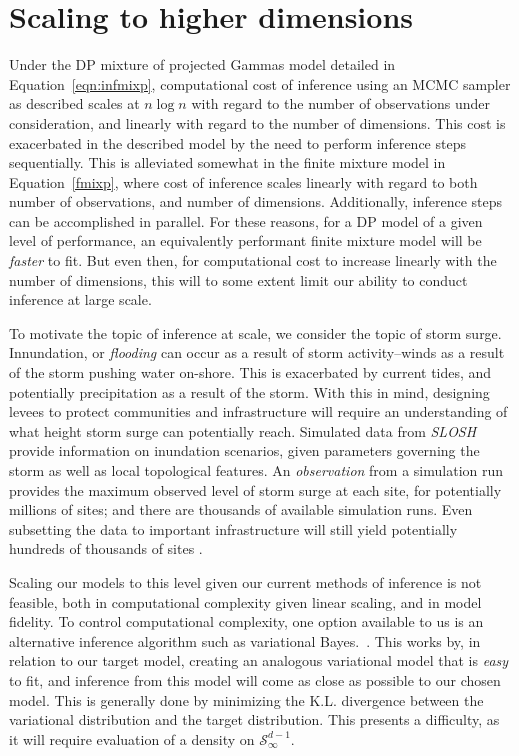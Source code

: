 \section{Scaling to higher dimensions}
Under the DP mixture of projected Gammas model detailed in Equation~\ref{eqn:infmixp}, computational
  cost of inference using an MCMC sampler as described scales at $n\log n$ with regard to the number
  of observations under consideration, and linearly with regard to the number of dimensions.  This cost
  is exacerbated in the described model by the need to perform inference steps sequentially.  This is
  alleviated somewhat in the finite mixture model in Equation~\ref{fmixp}, where cost of inference scales
  linearly with regard to both number of observations, and number of dimensions.  Additionally, inference
  steps can be accomplished in parallel.  For these reasons, for a DP model of a given level of performance,
  an equivalently performant finite mixture model will be \emph{faster} to fit.  But even then, for
  computational cost to increase linearly with the number of dimensions, this will to some extent limit
  our ability to conduct inference at large scale.

To motivate the topic of inference at scale, we consider the topic of storm surge.  Innundation, or
  \emph{flooding} can occur as a result of storm activity--winds as a result of the storm pushing water
  on-shore.  This is exacerbated by current tides, and potentially precipitation as a result of the storm.
  With this in mind, designing levees to protect communities and infrastructure will require an
  understanding of what height storm surge can potentially reach.  Simulated data from
  \emph{SLOSH}~\citep{jelesnianski1992} provide information on inundation scenarios, given parameters
  governing the storm as well as local topological features.  An \emph{observation} from a simulation
  run provides the maximum observed level of storm surge at each site, for potentially millions of sites;
  and there are thousands of available simulation runs.  Even subsetting the data to important
  infrastructure will still yield potentially hundreds of thousands of sites \citep{hutchings2021}.

Scaling our models to this level given our current methods of inference is not feasible, both in
  computational complexity given linear scaling, and in model fidelity.   To control computational
  complexity, one option available to us is an alternative inference algorithm such as variational
  Bayes.~\cite{green2015}.  This works by, in relation to our target model, creating an analogous
  variational model that is \emph{easy} to fit, and inference from this model will come as close as
  possible to our chosen model.  This is generally done by minimizing the K.L. divergence between
  the variational distribution and the target distribution.  This presents a difficulty, as it will
  require evaluation of a density on $\mathcal{S}_{\infty}^{d-1}$.

